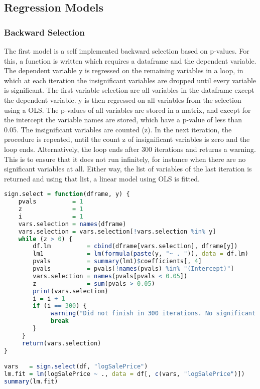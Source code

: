 \subsection{Regression Models}
\subsubsection{Backward Selection}
The first model is a self implemented backward selection based on p-values. For this, a function is written which requires a dataframe and the dependent variable. The dependent variable y is regressed on the remaining variables 
in a loop, in which at each iteration the insignificant variables
are dropped until every variable is significant. 
The first variable selection are all variables in the dataframe except the dependent variable. y is then regressed on all variables from the selection using a OLS. The p-values of all variables are stored in a matrix, and except
for the intercept the variable names are stored, which have a p-value
of less than 0.05. The insignificant variables are counted (z).  In the next iteration, the procedure is repeated,
until the count z of insignificant variables is zero and the loop
ends. Alternatively, the loop ends after 300 iterations and returns a warning. This is to ensure
that it does not run infinitely, for instance when there are no significant variables at all. 
Either way, the list of variables of the last iteration is returned and using that list,  a linear model using OLS is fitted. 


\begin{lstlisting}[language=R]
sign.select = function(dframe, y) {
    pvals          = 1
    z              = 1
    i              = 1
    vars.selection = names(dframe)
    vars.selection = vars.selection[!vars.selection %in% y]
    while (z > 0) {
        df.lm          = cbind(dframe[vars.selection], dframe[y])
        lm1            = lm(formula(paste(y, "~ . ")), data = df.lm)
        pvals          = summary(lm1)$coefficients[, 4]
        pvals          = pvals[!names(pvals) %in% "(Intercept)"]
        vars.selection = names(pvals[pvals < 0.05])
        z              = sum(pvals > 0.05)
        print(vars.selection)
        i = i + 1
        if (i == 300) {
             warning("Did not finish in 300 iterations. No significant variables in data set?")
             break
        }
     }
     return(vars.selection)
}

vars   = sign.select(df, "logSalePrice")
lm.fit = lm(logSalePrice ~ ., data = df[, c(vars, "logSalePrice")])
summary(lm.fit)
\end{lstlisting}

